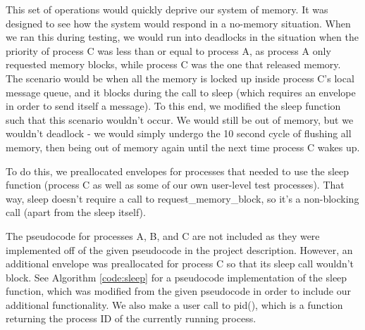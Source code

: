 \documentclass[12pt]{report}
\begin{document}
    This set of operations would quickly deprive our system of memory.  It was
    designed to see how the system would respond in a no-memory situation.  When
    we ran this during testing, we would run into deadlocks in the situation
    when the priority of process C was less than or equal to process A, as
    process A only requested memory blocks, while process C was the one that
    released memory.  The scenario would be when all the memory is locked up
    inside process C's local message queue, and it blocks during the call to
    sleep (which requires an envelope in order to send itself a message).  To
    this end, we modified the sleep function such that this scenario wouldn't
    occur.  We would still be out of memory, but we wouldn't deadlock - we
    would simply undergo the 10 second cycle of flushing all memory, then being
    out of memory again until the next time process C wakes up.

    To do this, we preallocated envelopes for processes that needed to use the
    sleep function (process C as well as some of our own user-level test
    processes).  That way, sleep doesn't require a call to
    request\_memory\_block, so it's a non-blocking call (apart from the sleep
    itself).

    The pseudocode for processes A, B, and C are not included as they were
    implemented off of the given pseudocode in the project description.
    However, an additional envelope was preallocated for process C so that its
    sleep call wouldn't block.  See Algorithm \ref{code:sleep} for a pseudocode
    implementation of the sleep function, which was modified from the given
    pseudocode in order to include our additional functionality.  We also make a
    user call to pid(), which is a function returning the process ID of the
    currently running process.
\end{document}
